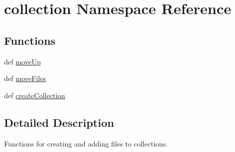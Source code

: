 \hypertarget{namespacecollection}{\section{collection Namespace Reference}
\label{namespacecollection}
}
\subsection*{Functions}
\begin{DoxyCompactItemize}
\item 
def \hyperlink{namespacecollection_aefaf166aee0ea51ceafd86600e5f90bb}{move\-Up}
\item 
def \hyperlink{namespacecollection_acfea76672a57d757e0b6104507715cd2}{move\-Files}
\item 
def \hyperlink{namespacecollection_a2385617fa2cd3823939a9ad0dcfe642e}{create\-Collection}
\end{DoxyCompactItemize}


\subsection{Detailed Description}
\begin{DoxyVerb}    Functions for creating and adding files to collections.
\end{DoxyVerb}
 

